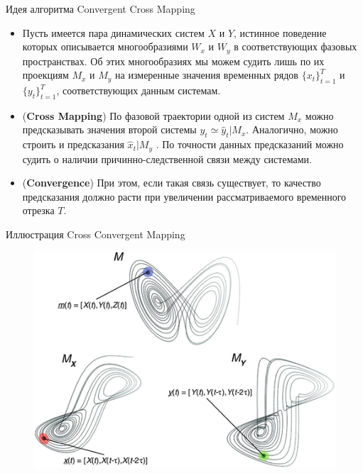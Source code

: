 \begin{frame}{Идея алгоритма Convergent Cross Mapping}

\begin{itemize}
    \item Пусть имеется пара динамических систем $X$ и $Y$, истинное поведение которых описывается многообразиями $W_x$ и $W_y$ в соответствующих фазовых пространствах.
Об этих многообразиях мы можем судить лишь по их проекциям $M_x$ и $M_y$ на измеренные значения временных рядов $\{x_t\}_{t=1}^T$ и $\{y_t\}_{t=1}^T$, соответствующих данным системам.
    \item (\textbf{Cross Mapping}) По фазовой траектории одной из систем $M_x$ можно предсказывать значения второй системы $y_t \simeq \hat{y}_t|M_x$. Аналогично, можно строить и предсказания $\hat{x}_t|M_y$ . По точности данных предсказаний можно судить о наличии причинно-следственной связи между системами.
    \item (\textbf{Convergence}) При этом, если такая связь существует, то качество предсказания должно расти при увеличении рассматриваемого временного отрезка $T$.
    
\end{itemize}

\end{frame}
\begin{frame}{Иллюстрация Cross Convergent Mapping}
\begin{figure}
    \centering
    \includegraphics[width=\textwidth]{lecture_4/figs/CCM.png}
\end{figure}
\end{frame}

